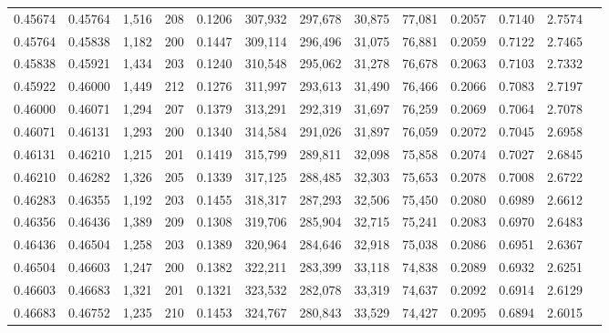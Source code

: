 \begin{tabular}{rrrrrrrrrrrrr}
0.45674 & 0.45764 & 1,516 & 208 &                                     0.1206 & 307,932 & 297,678 &  30,875 &  77,081 & 0.2057 & 0.7140 & 2.7574 \\
0.45764 & 0.45838 & 1,182 & 200 &                                     0.1447 & 309,114 & 296,496 &  31,075 &  76,881 & 0.2059 & 0.7122 & 2.7465 \\
0.45838 & 0.45921 & 1,434 & 203 &                                     0.1240 & 310,548 & 295,062 &  31,278 &  76,678 & 0.2063 & 0.7103 & 2.7332 \\
0.45922 & 0.46000 & 1,449 & 212 &                                     0.1276 & 311,997 & 293,613 &  31,490 &  76,466 & 0.2066 & 0.7083 & 2.7197 \\
0.46000 & 0.46071 & 1,294 & 207 &                                     0.1379 & 313,291 & 292,319 &  31,697 &  76,259 & 0.2069 & 0.7064 & 2.7078 \\
0.46071 & 0.46131 & 1,293 & 200 &                                     0.1340 & 314,584 & 291,026 &  31,897 &  76,059 & 0.2072 & 0.7045 & 2.6958 \\
0.46131 & 0.46210 & 1,215 & 201 &                                     0.1419 & 315,799 & 289,811 &  32,098 &  75,858 & 0.2074 & 0.7027 & 2.6845 \\
0.46210 & 0.46282 & 1,326 & 205 &                                     0.1339 & 317,125 & 288,485 &  32,303 &  75,653 & 0.2078 & 0.7008 & 2.6722 \\
0.46283 & 0.46355 & 1,192 & 203 &                                     0.1455 & 318,317 & 287,293 &  32,506 &  75,450 & 0.2080 & 0.6989 & 2.6612 \\
0.46356 & 0.46436 & 1,389 & 209 &                                     0.1308 & 319,706 & 285,904 &  32,715 &  75,241 & 0.2083 & 0.6970 & 2.6483 \\
0.46436 & 0.46504 & 1,258 & 203 &                                     0.1389 & 320,964 & 284,646 &  32,918 &  75,038 & 0.2086 & 0.6951 & 2.6367 \\
0.46504 & 0.46603 & 1,247 & 200 &                                     0.1382 & 322,211 & 283,399 &  33,118 &  74,838 & 0.2089 & 0.6932 & 2.6251 \\
0.46603 & 0.46683 & 1,321 & 201 &                                     0.1321 & 323,532 & 282,078 &  33,319 &  74,637 & 0.2092 & 0.6914 & 2.6129 \\
0.46683 & 0.46752 & 1,235 & 210 &                                     0.1453 & 324,767 & 280,843 &  33,529 &  74,427 & 0.2095 & 0.6894 & 2.6015 \\

\end{tabular}
